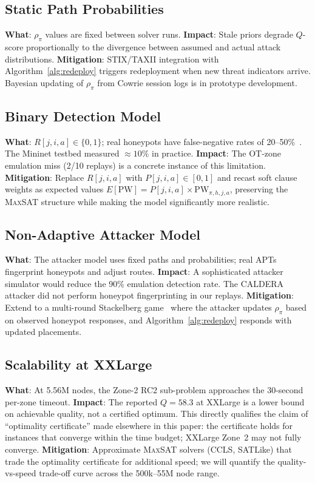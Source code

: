 \documentclass[journal]{IEEEtran}
\newcommand{\MAXSAT}{\textsc{MaxSAT}}
\newcommand{\qscore}{$Q$-score}
\begin{document}
\subsection{Static Path Probabilities}
\textbf{What}: $\rho_\pi$ values are fixed between solver runs.
\textbf{Impact}: Stale priors degrade \qscore{} proportionally to
the divergence between assumed and actual attack distributions.
\textbf{Mitigation}: STIX/TAXII integration with
Algorithm~\ref{alg:redeploy} triggers redeployment when new threat
indicators arrive. Bayesian updating of $\rho_\pi$ from Cowrie
session logs is in prototype development.

\subsection{Binary Detection Model}
\label{sec:limitations:binary}
\textbf{What}: $R[j,i,a]\in\{0,1\}$; real honeypots have
false-negative rates of 20--50\%~\cite{huang2019}. The Mininet
testbed measured $\approx10\%$ in practice.
\textbf{Impact}: The OT-zone emulation miss (2/10 replays) is a
concrete instance of this limitation.
\textbf{Mitigation}: Replace $R[j,i,a]$ with $P[j,i,a]\in[0,1]$
and recast soft clause weights as expected values
$E[\mathrm{PW}]=P[j,i,a]\times\mathrm{PW}_{\pi,h,j,a}$, preserving
the \MAXSAT{} structure while making the model significantly more
realistic.

\subsection{Non-Adaptive Attacker Model}
\textbf{What}: The attacker model uses fixed paths and
probabilities; real APTs fingerprint honeypots and adjust routes.
\textbf{Impact}: A sophisticated attacker simulator would reduce
the 90\% emulation detection rate. The CALDERA attacker did not
perform honeypot fingerprinting in our replays.
\textbf{Mitigation}: Extend to a multi-round Stackelberg
game~\cite{kiekintveld2015} where the attacker updates $\rho_\pi$
based on observed honeypot responses, and Algorithm~\ref{alg:redeploy}
responds with updated placements.

\subsection{Scalability at XXLarge}
\label{sec:limitations:scale}
\textbf{What}: At 5.56M nodes, the Zone-2 RC2 sub-problem
approaches the 30-second per-zone timeout.
\textbf{Impact}: The reported $Q=58.3$ at XXLarge is a lower bound
on achievable quality, not a certified optimum. This directly
qualifies the claim of ``optimality certificate'' made elsewhere in
this paper: the certificate holds for instances that converge within
the time budget; XXLarge Zone~2 may not fully converge.
\textbf{Mitigation}: Approximate \MAXSAT{} solvers (CCLS, SATLike)
that trade the optimality certificate for additional speed; we will
quantify the quality-vs-speed trade-off curve across the
500k--55M node range.
\end{document}
